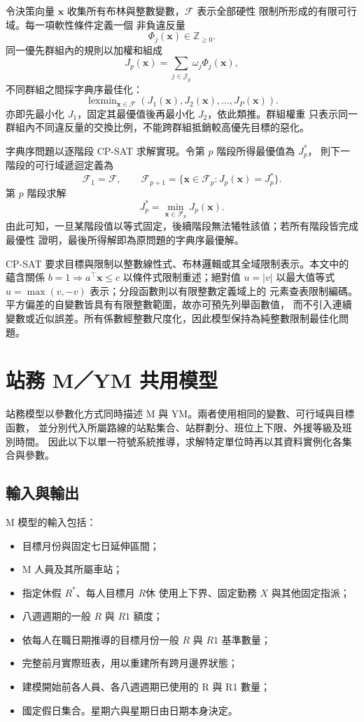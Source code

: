 \documentclass[a4paper,12pt]{article}
\begin{document}
令決策向量 \(\mathbf x\) 收集所有布林與整數變數，\(\mathcal{F}\) 表示全部硬性
限制所形成的有限可行域。每一項軟性條件定義一個
非負違反量
\[
  \Phi_j(\mathbf{x})\in\mathbb{Z}_{\geq0}.
\]
同一優先群組內的規則以加權和組成
\[
  J_p(\mathbf{x})
  =
  \sum_{j\in\mathcal{J}_p}\omega_j\Phi_j(\mathbf{x}),
\]
不同群組之間採字典序最佳化：
\[
  \operatorname{lexmin}_{\mathbf{x}\in\mathcal{F}}
  \left(J_1(\mathbf{x}),J_2(\mathbf{x}),\ldots,J_P(\mathbf{x})\right).
\]
亦即先最小化 \(J_1\)，固定其最優值後再最小化 \(J_2\)，依此類推。群組權重
只表示同一群組內不同違反量的交換比例，不能跨群組抵銷較高優先目標的惡化。

字典序問題以逐階段 CP-SAT 求解實現。令第 \(p\) 階段所得最優值為 \(J_p^*\)，
則下一階段的可行域遞迴定義為
\[
  \mathcal F_1=\mathcal F,
  \qquad
  \mathcal F_{p+1}
  =\{\mathbf x\in\mathcal F_p:J_p(\mathbf x)=J_p^*\}.
\]
第 \(p\) 階段求解
\[
  J_p^*=\min_{\mathbf x\in\mathcal F_p}J_p(\mathbf x).
\]
由此可知，一旦某階段值以等式固定，後續階段無法犧牲該值；若所有階段皆完成最優性
證明，最後所得解即為原問題的字典序最優解。

CP-SAT 要求目標與限制以整數線性式、布林邏輯或其全域限制表示。本文中的蘊含關係
\(b=1\Rightarrow a^\top\mathbf x\leq c\) 以條件式限制重述；絕對值
\(u=|v|\) 以最大值等式 \(u=\max(v,-v)\) 表示；分段函數則以有限整數定義域上的
元素查表限制編碼。平方偏差的自變數皆具有有限整數範圍，故亦可預先列舉函數值，
而不引入連續變數或近似誤差。所有係數經整數尺度化，因此模型保持為純整數限制最佳化問題。

\section{站務 M／YM 共用模型}

站務模型以參數化方式同時描述 M 與 YM。兩者使用相同的變數、可行域與目標函數，
並分別代入所屬路線的站點集合、站群劃分、班位上下限、外援等級及班別時間。
因此以下以單一符號系統推導，求解特定單位時再以其資料實例化各集合與參數。

\subsection{輸入與輸出}

M 模型的輸入包括：
\begin{itemize}
  \item 目標月份與固定七日延伸區間；
  \item M 人員及其所屬車站；
  \item 指定休假 \(R^*\)、每人目標月 \(R休\) 使用上下界、固定勤務 \(X\) 與其他固定指派；
  \item 八週週期的一般 \(R\) 與 \(R1\) 額度；
  \item 依每人在職日期推導的目標月份一般 \(R\) 與 \(R1\) 基準數量；
  \item 完整前月實際班表，用以重建所有跨月邊界狀態；
  \item 建模開始前各人員、各八週週期已使用的 R 與 R1 數量；
  \item 國定假日集合。星期六與星期日由日期本身決定。
\end{itemize}
\end{document}
